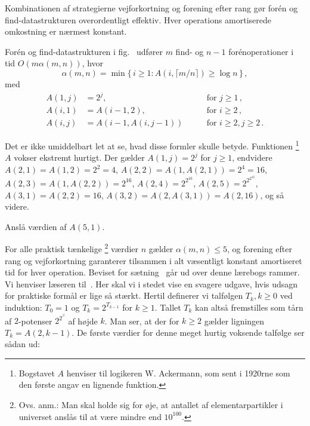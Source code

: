 Kombinationen af strategierne vejforkortning og forening efter rang gør forén og find-datastrukturen overordentligt effektiv.
Hver operations amortiserede omkostning er nærmest konstant.

\begin{thm}
  Forén og find-datastrukturen i fig.~ udfører $m$ find- og $n-1$ forén\-operationer i tid $O(m\alpha(m,n))$, hvor
\[ 
  \alpha(m,n) = \min\{\,i\geq 1\colon A(i,\lceil m/n\rceil)\geq \log n\,\}\,,
\]
  med
  \begin{align*}
    A(1,j)&= 2^j,&\text{for } j\geq 1\,,\\
    A(i,1)&= A(i-1,2),&\text{for } i\geq 2\,,\\
    A(i,j)&=A(i-1,A(i,j-1)) \qquad &\text{for } i\geq 2,j\geq 2\,.
  \end{align*}
\end{thm}

Det er ikke umiddelbart let at se, hvad disse formler skulle betyde.
Funktionen%
\footnote{Bogstavet $A$ henviser til logikeren W. Ackermann, som sent i 1920rne som den første angav en lignende funktion.}
$A$ vokser ekstremt hurtigt.
Der gælder $A(1,j)=2^j$ for $j\geq 1$, endvidere $A(2,1)=A(1,2)=2^2=4$, $A(2,2)=A(1,A(2,1))=2^4= 16$, $A(2,3)=A(1,A(2,2)) = 2^{16}$,
$A(2,4)=2^{2^{16}}$, 
$A(2,5)=2^{2^{2^{16}}}$, 
$A(3,1)=A(2,2)=16$,
$A(3,2)=A(2,A(3,1))=A(2,16)$, og så videre.

\begin{exerc}
 Anslå værdien af $A(5,1)$.
\end{exerc}

For alle praktisk tænkelige
\footnote{Ovs. anm.: Man skal holde sig for øje, at antallet af elementarpartikler i universet anslås til at være mindre end $10^{100}$.}
værdier $n$ gælder $\alpha(m,n)\leq 5$, og forening efter rang og vejforkortning garanterer tilsammen i alt væsentligt konstant amortiseret tid for hver operation.
Beviset for sætning~ går ud over denne lærebogs rammer.
Vi henviser læseren til~\cite{Tarjan:union-find,Seidel:union-find}.
Her skal vi i stedet vise en svagere udgave, hvis udsagn for praktiske formål er lige så stærkt.
Hertil definerer vi talfølgen $T_k, k\geq 0$ ved induktion: 
$T_0=1$ og $T_k= 2^{T_{k-1}}$ for $k\geq 1$.
Tallet $T_k$ kan altså fremstilles som tårn af $2$-potenser $2^{2^{\vdots^2}}$ af højde $k$.
Man ser, at der for $k\geq 2$ gælder ligningen $T_k = A(2,k-1)$.
De første værdier for denne meget hurtig voksende talfølge ser sådan ud:

